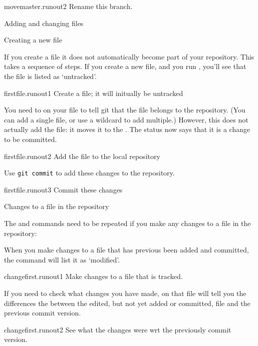 \begin{gitstep}{movemaster.runout2}
  Rename this branch.
\end{gitstep}

\newpage
{} {Adding and changing files}
\label{sec:hg-push}

 {Creating a new file}

If you create a file it does not automatically become part of your repository.
This takes a sequence of steps.
If you create a new file, and you run ,
you'll see that the file is listed as `untracked'.

\begin{gitstep}{firstfile.runout1}
  Create a file; it will initually be untracked
\end{gitstep}

You need to  on your file to tell git that the file
belongs to the repository.
(You can add a single file, or use a wildcard to add multiple.)
However, this does not actually add the file:
it moves it to the .
The status now says that it is a change to be committed.

\begin{gitstep}{firstfile.runout2}
  Add the file to the local repository
\end{gitstep}

Use \lstinline{git commit} to add these changes to the repository.

\begin{gitstep}{firstfile.runout3}
  Commit these changes
\end{gitstep}

\newpage
{} {Changes to a file in the repository}

The  and  commands need to be repeated
if you make any changes to a file in the repository:

When you make changes to a file that has previous been added and committed,
the  command will list it as `modified'.

\begin{gitstep}{changefirst.runout1}
  Make changes to a file that is tracked.
\end{gitstep}

If you need to check what changes you have made,  on that file
will tell you the differences the between the edited, but not yet added or committed,
file and the previous commit version.

\begin{gitstep}{changefirst.runout2}
  See what the changes were wrt the previously commit version.
\end{gitstep}

